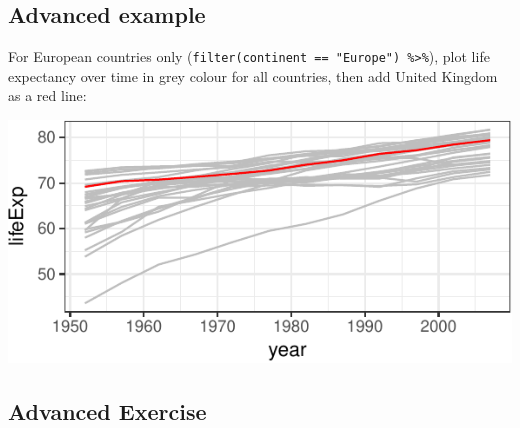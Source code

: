 \documentclass[12pt,]{krantz}
\makeatletter
\newenvironment{Shaded}{\begin{snugshade}}{\end{snugshade}}
\newcommand{\CommentTok}[1]{\textcolor[rgb]{0.56,0.35,0.01}{\textit{#1}}}
\newcommand{\DataTypeTok}[1]{\textcolor[rgb]{0.13,0.29,0.53}{#1}}
\newcommand{\KeywordTok}[1]{\textcolor[rgb]{0.13,0.29,0.53}{\textbf{#1}}}
\newcommand{\NormalTok}[1]{#1}
\newcommand{\OperatorTok}[1]{\textcolor[rgb]{0.81,0.36,0.00}{\textbf{#1}}}
\newcommand{\StringTok}[1]{\textcolor[rgb]{0.31,0.60,0.02}{#1}}
\newenvironment{kframe}{%
\medskip{}
\setlength{\fboxsep}{.8em}
 \def\at@end@of@kframe{}%
 \ifinner\ifhmode%
  \def\at@end@of@kframe{\end{minipage}}%
  \begin{minipage}{\columnwidth}%
 \fi\fi%
 \def\FrameCommand##1{\hskip\@totalleftmargin \hskip-\fboxsep
 \colorbox{shadecolor}{##1}\hskip-\fboxsep
     \hskip-\linewidth \hskip-\@totalleftmargin \hskip\columnwidth}%
 \MakeFramed {\advance\hsize-\width
   \@totalleftmargin\z@ \linewidth\hsize
   \@setminipage}}%
 {\par\unskip\endMakeFramed%
 \at@end@of@kframe}
\renewenvironment{Shaded}{\begin{kframe}}{\end{kframe}}
\theoremstyle{definition}
\theoremstyle{definition}
\theoremstyle{definition}
\theoremstyle{remark}
\makeatother
\begin{document}
\hypertarget{advanced-example}{%
\subsection{Advanced example}\label{advanced-example}}

For European countries only
(\texttt{filter(continent\ ==\ "Europe")\ \%\textgreater{}\%}), plot
life expectancy over time in grey colour for all countries, then add
United Kingdom as a red line:

\begin{Shaded}
\end{Shaded}

\includegraphics{04_plotting_files/figure-latex/unnamed-chunk-7-1.pdf}

\hypertarget{advanced-exercise}{%
\subsection{Advanced Exercise}\label{advanced-exercise}}
\end{document}
